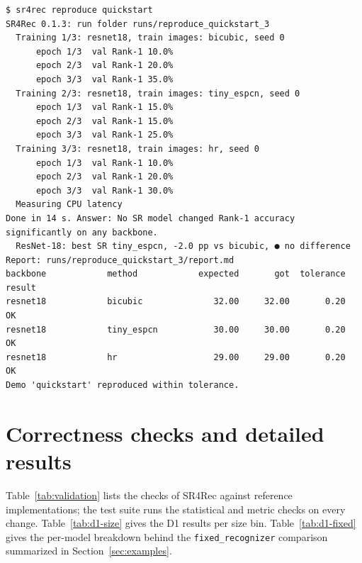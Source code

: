 \documentclass[preprint,12pt]{elsarticle}
\newcommand{\generated}[3]{}
\begin{document}
\begin{lstlisting}[style=srsh,caption={Console session: \texttt{init}, \texttt{run -{}-dry-run},
\texttt{run} and \texttt{reproduce} on the Oxford-IIIT Pet quickstart.},label=lst:console]
$ sr4rec reproduce quickstart
SR4Rec 0.1.3: run folder runs/reproduce_quickstart_3
  Training 1/3: resnet18, train images: bicubic, seed 0
      epoch 1/3  val Rank-1 10.0%
      epoch 2/3  val Rank-1 20.0%
      epoch 3/3  val Rank-1 35.0%
  Training 2/3: resnet18, train images: tiny_espcn, seed 0
      epoch 1/3  val Rank-1 15.0%
      epoch 2/3  val Rank-1 15.0%
      epoch 3/3  val Rank-1 25.0%
  Training 3/3: resnet18, train images: hr, seed 0
      epoch 1/3  val Rank-1 10.0%
      epoch 2/3  val Rank-1 20.0%
      epoch 3/3  val Rank-1 30.0%
  Measuring CPU latency
Done in 14 s. Answer: No SR model changed Rank-1 accuracy significantly on any backbone.
  ResNet-18: best SR tiny_espcn, -2.0 pp vs bicubic, ● no difference
Report: runs/reproduce_quickstart_3/report.md
backbone            method            expected       got  tolerance  result
resnet18            bicubic              32.00     32.00       0.20  OK
resnet18            tiny_espcn           30.00     30.00       0.20  OK
resnet18            hr                   29.00     29.00       0.20  OK
Demo 'quickstart' reproduced within tolerance.
\end{lstlisting}

\section{Correctness checks and detailed results}
\label{app:details}
Table~\ref{tab:validation} lists the checks of SR4Rec against reference implementations; the test
suite runs the statistical and metric checks on every change. Table~\ref{tab:d1-size} gives the D1
results per size bin. Table~\ref{tab:d1-fixed} gives the per-model breakdown behind the
\texttt{fixed\_recognizer} comparison summarized in Section~\ref{sec:examples}.

\generated{tab_validation.tex}{correctness checks, from paper/validation.yaml}{tab:validation}
\generated{tab_d1_by_size.tex}{D1 results by size bin, from scripts/make\_paper\_assets.py}{tab:d1-size}
\generated{tab_d1_fixed_main.tex}{D1 fixed\_recognizer per-model breakdown, from scripts/make\_paper\_assets.py}{tab:d1-fixed}
\FloatBarrier



\end{document}
